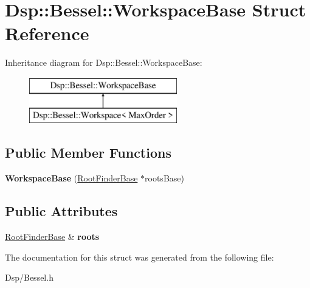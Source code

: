 \hypertarget{structDsp_1_1Bessel_1_1WorkspaceBase}{\section{Dsp\-:\-:Bessel\-:\-:Workspace\-Base Struct Reference}
\label{structDsp_1_1Bessel_1_1WorkspaceBase}
}
Inheritance diagram for Dsp\-:\-:Bessel\-:\-:Workspace\-Base\-:\begin{figure}[H]
\begin{center}
\leavevmode
\includegraphics[height=2.000000cm]{structDsp_1_1Bessel_1_1WorkspaceBase}
\end{center}
\end{figure}
\subsection*{Public Member Functions}
\begin{DoxyCompactItemize}
\item 
\hypertarget{structDsp_1_1Bessel_1_1WorkspaceBase_acfe1198ec20699d855b3cf5435d273e1}{{\bfseries Workspace\-Base} (\hyperlink{classDsp_1_1RootFinderBase}{Root\-Finder\-Base} $\ast$roots\-Base)}\label{structDsp_1_1Bessel_1_1WorkspaceBase_acfe1198ec20699d855b3cf5435d273e1}

\end{DoxyCompactItemize}
\subsection*{Public Attributes}
\begin{DoxyCompactItemize}
\item 
\hypertarget{structDsp_1_1Bessel_1_1WorkspaceBase_adbbf8eb0403a0a945189916016de27a3}{\hyperlink{classDsp_1_1RootFinderBase}{Root\-Finder\-Base} \& {\bfseries roots}}\label{structDsp_1_1Bessel_1_1WorkspaceBase_adbbf8eb0403a0a945189916016de27a3}

\end{DoxyCompactItemize}


The documentation for this struct was generated from the following file\-:\begin{DoxyCompactItemize}
\item 
Dsp/Bessel.\-h\end{DoxyCompactItemize}
